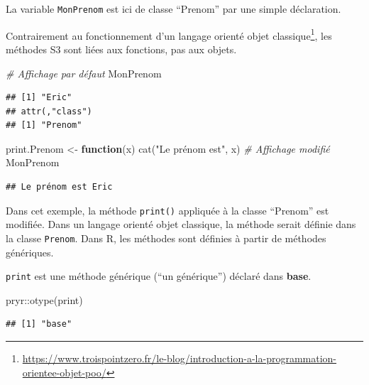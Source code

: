 \documentclass[
  11pt,
  french,
  a4paper,
  extrafontsizes,onecolumn,openright
  ]{memoir}
\newenvironment{Shaded}{\begin{snugshade}}{\end{snugshade}}
\newcommand{\CommentTok}[1]{\textcolor[rgb]{0.56,0.35,0.01}{\textit{#1}}}
\newcommand{\ControlFlowTok}[1]{\textcolor[rgb]{0.13,0.29,0.53}{\textbf{#1}}}
\newcommand{\FunctionTok}[1]{\textcolor[rgb]{0.00,0.00,0.00}{#1}}
\newcommand{\NormalTok}[1]{#1}
\newcommand{\OtherTok}[1]{\textcolor[rgb]{0.56,0.35,0.01}{#1}}
\newcommand{\SpecialCharTok}[1]{\textcolor[rgb]{0.00,0.00,0.00}{#1}}
\newcommand{\StringTok}[1]{\textcolor[rgb]{0.31,0.60,0.02}{#1}}
\begin{document}
\normalsize

La variable \texttt{MonPrenom} est ici de classe ``Prenom'' par une simple déclaration.

Contrairement au fonctionnement d'un langage orienté objet classique\footnote{\url{https://www.troispointzero.fr/le-blog/introduction-a-la-programmation-orientee-objet-poo/}}, les méthodes S3 sont liées aux fonctions, pas aux objets.

\scriptsize

\begin{Shaded}
\begin{Highlighting}[]
\CommentTok{\# Affichage par défaut}
\NormalTok{MonPrenom}
\end{Highlighting}
\end{Shaded}

\begin{verbatim}
## [1] "Eric"
## attr(,"class")
## [1] "Prenom"
\end{verbatim}

\begin{Shaded}
\begin{Highlighting}[]
\NormalTok{print.Prenom }\OtherTok{\textless{}{-}} \ControlFlowTok{function}\NormalTok{(x) }\FunctionTok{cat}\NormalTok{(}\StringTok{"Le prénom est"}\NormalTok{, x)}
\CommentTok{\# Affichage modifié}
\NormalTok{MonPrenom}
\end{Highlighting}
\end{Shaded}

\begin{verbatim}
## Le prénom est Eric
\end{verbatim}

\normalsize

Dans cet exemple, la méthode \texttt{print()} appliquée à la classe ``Prenom'' est modifiée.
Dans un langage orienté objet classique, la méthode serait définie dans la classe \texttt{Prenom}.
Dans R, les méthodes sont définies à partir de méthodes génériques.

\texttt{print} est une méthode générique (``un générique'') déclaré dans \textbf{base}.

\scriptsize

\begin{Shaded}
\begin{Highlighting}[]
\NormalTok{pryr}\SpecialCharTok{::}\FunctionTok{otype}\NormalTok{(print)}
\end{Highlighting}
\end{Shaded}

\begin{verbatim}
## [1] "base"
\end{verbatim}
\end{document}
